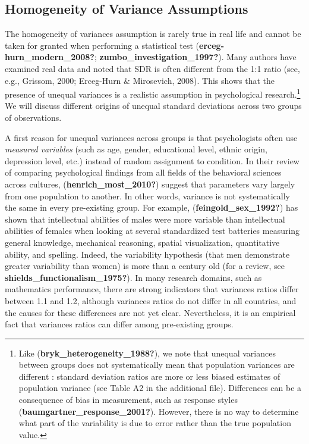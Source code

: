 \documentclass[
  english,
  man]{apa6}
\begin{document}
\hypertarget{homogeneity-of-variance-assumptions}{%
\subsection{Homogeneity of Variance Assumptions}\label{homogeneity-of-variance-assumptions}}

The homogeneity of variances assumption is rarely true in real life and cannot be taken for granted when performing a statistical test (\textbf{erceg-hurn\_modern\_2008?}; \textbf{zumbo\_investigation\_1997?}). Many authors have examined real data and noted that SDR is often different from the 1:1 ratio (see, e.g., Grissom, 2000; Erceg-Hurn \(\&\) Mirosevich, 2008). This shows that the presence of unequal variances is a realistic assumption in psychological research.\footnote{Like (\textbf{bryk\_heterogeneity\_1988?}), we note that unequal variances between groups does not systematically mean that population variances are different : standard deviation ratios are more or less biased estimates of population variance (see Table A2 in the additional file). Differences can be a consequence of bias in measurement, such as response styles (\textbf{baumgartner\_response\_2001?}). However, there is no way to determine what part of the variability is due to error rather than the true population value.} We will discuss different origins of unequal standard deviations across two groups of observations.

A first reason for unequal variances across groups is that psychologists often use \emph{measured variables} (such as age, gender, educational level, ethnic origin, depression level, etc.) instead of random assignment to condition. In their review of comparing psychological findings from all fields of the behavioral sciences across cultures, (\textbf{henrich\_most\_2010?}) suggest that parameters vary largely from one population to another. In other words, variance is not systematically the same in every pre-existing group. For example, (\textbf{feingold\_sex\_1992?}) has shown that intellectual abilities of males were more variable than intellectual abilities of females when looking at several standardized test batteries measuring general knowledge, mechanical reasoning, spatial visualization, quantitative ability, and spelling. Indeed, the variability hypothesis (that men demonstrate greater variability than women) is more than a century old (for a review, see \textbf{shields\_functionalism\_1975?}). In many research domains, such as mathematics performance, there are strong indicators that variances ratios differ between 1.1 and 1.2, although variances ratios do not differ in all countries, and the causes for these differences are not yet clear. Nevertheless, it is an empirical fact that variances ratios can differ among pre-existing groups.
\end{document}

